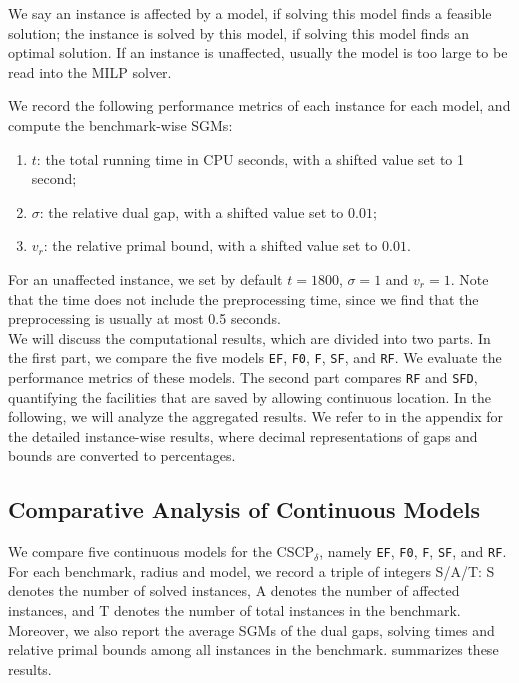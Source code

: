 \documentclass[review]{elsarticle}
\newcommand{\dlt}{{\delta}}
\newcommand{\problem}{CSCP$_\dlt$}
\theoremstyle{definition}
\begin{document}
We say an instance is affected by a model, if solving this model finds a feasible solution; the instance is solved by this model, if solving this model finds an optimal solution. If an instance is unaffected, usually the model is too large to be read into the MILP solver.


We record the following performance metrics of each instance for each model, and compute the benchmark-wise SGMs:

 
\begin{enumerate}
	\item $t$: the total running time in CPU seconds, with a shifted value set to 1 second;
    
   \item $\sigma$: the relative dual gap, with a shifted value set to $0.01$;
  	\item $v_r$: the relative primal bound, with a shifted value set to $0.01$.
	 
\end{enumerate}
For an unaffected instance, we set by default $t= 1800$, $\sigma = 1$ and $v_r = 1$. Note that the time does not include the preprocessing time, since we find that the preprocessing is usually at most 0.5 seconds. \\

We will discuss the computational results, which are divided into two parts. In the first part, we compare the five models \texttt{EF}, \texttt{F0}, \texttt{F}, \texttt{SF}, and \texttt{RF}. We evaluate the performance metrics of these models. The second part compares \texttt{RF}  and \texttt{SFD},  quantifying the facilities that are saved by allowing continuous location. In the following, we will analyze the aggregated results. We refer to    in
the appendix for the detailed instance-wise results, where decimal representations of gaps and bounds are converted to percentages.

\subsection{Comparative Analysis of Continuous Models}



We compare five continuous models for the \problem, namely  \texttt{EF}, \texttt{F0}, \texttt{F}, \texttt{SF}, and \texttt{RF}. For each  benchmark, radius and model, we record a triple of integers S/A/T: S denotes the number of solved instances, A denotes the number of affected instances, and T denotes the number of total instances in the benchmark. Moreover, we also report the  average SGMs of the dual gaps, solving times and relative primal bounds among all instances in the benchmark.  summarizes these results.
 
\end{document}
